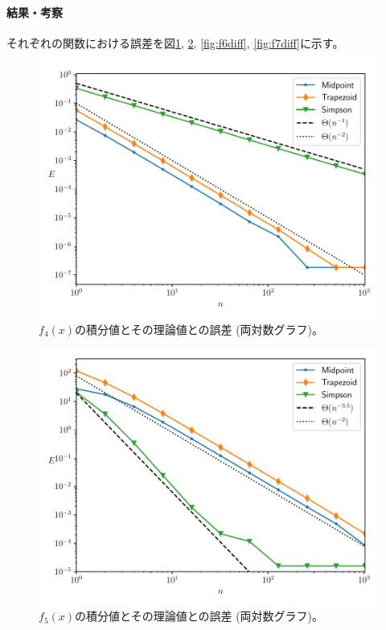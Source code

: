 \documentclass[a4j, titlepage]{jsarticle}
\numberwithin{equation}{section}
\begin{document}
            \paragraph{結果・考察}
                それぞれの関数における誤差を図\ref{fig:f4diff}, \ref{fig:f5diff}, \ref{fig:f6diff}, \ref{fig:f7diff}に示す。
                \begin{figure}[h]
                    \centering
                    \includegraphics[width=0.8\hsize]{kadai2/3/f4.pdf}
                    \caption{
                        $f_4(x)$の積分値とその理論値との誤差 (両対数グラフ)。
                    }
                    \label{fig:f4diff}
                \end{figure}
                \begin{figure}[h]
                    \centering
                    \includegraphics[width=0.8\hsize]{kadai2/3/f5.pdf}
                    \caption{
                        $f_5(x)$の積分値とその理論値との誤差 (両対数グラフ)。
                    }
                    \label{fig:f5diff}
                \end{figure}
\end{document}
